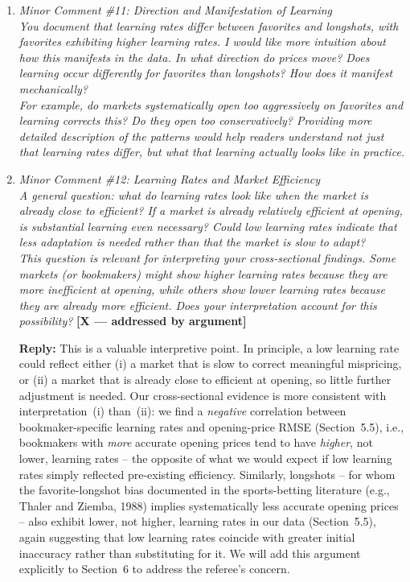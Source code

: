 \documentclass[letterpaper,12pt]{article}
\newcounter{b}
\newcommand{\argX}{\textcolor{green!55!black}{\textbf{[X --- addressed by argument]}}}
\newcommand{\Reply}[1]{\par\noindent\textbf{Reply:} #1}
\begin{document}
\begin{enumerate}
\Reply{We agree and will remove Figure~6 (the learning-rate-versus-RMSE regression plot) from the main text, retaining the qualitative description of the negative correlation between bookmaker-specific learning rates and opening RMSE (reported in Section~5.5) in the text only.}

\item \textit{Minor Comment \#11: Direction and Manifestation of Learning\\[6pt]
You document that learning rates differ between favorites and longshots, with favorites exhibiting higher learning rates. I would like more intuition about how this manifests in the data. In what direction do prices move? Does learning occur differently for favorites than longshots? How does it manifest mechanically?\\[6pt]
For example, do markets systematically open too aggressively on favorites and learning corrects this? Do they open too conservatively? Providing more detailed description of the patterns would help readers understand not just that learning rates differ, but what that learning actually looks like in practice.}

\item \textit{Minor Comment \#12: Learning Rates and Market Efficiency\\[6pt]
A general question: what do learning rates look like when the market is already close to efficient? If a market is already relatively efficient at opening, is substantial learning even necessary? Could low learning rates indicate that less adaptation is needed rather than that the market is slow to adapt?\\[6pt]
This question is relevant for interpreting your cross-sectional findings. Some markets (or bookmakers) might show higher learning rates because they are more inefficient at opening, while others show lower learning rates because they are already more efficient. Does your interpretation account for this possibility?} \argX

\Reply{This is a valuable interpretive point. In principle, a low learning rate could reflect either (i) a market that is slow to correct meaningful mispricing, or (ii) a market that is already close to efficient at opening, so little further adjustment is needed. Our cross-sectional evidence is more consistent with interpretation~(i) than~(ii): we find a \emph{negative} correlation between bookmaker-specific learning rates and opening-price RMSE (Section~5.5), i.e., bookmakers with \emph{more} accurate opening prices tend to have \emph{higher}, not lower, learning rates -- the opposite of what we would expect if low learning rates simply reflected pre-existing efficiency. Similarly, longshots -- for whom the favorite-longshot bias documented in the sports-betting literature (e.g., Thaler and Ziemba, 1988) implies systematically less accurate opening prices -- also exhibit lower, not higher, learning rates in our data (Section~5.5), again suggesting that low learning rates coincide with greater initial inaccuracy rather than substituting for it. We will add this argument explicitly to Section~6 to address the referee's concern.}


\end{enumerate}
\end{document}
